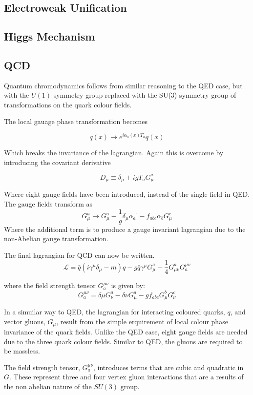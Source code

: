 \subsection{Electroweak Unification}

\subsection{Higgs Mechanism}

\subsection{QCD}
Quantum chromodynamics follows from similar reasoning to the QED case, but with
the $U(1)$ symmetry group replaced with the SU(3) symmetry group of
transformations on the quark colour fields.

The local gauage phase transformation becomes

\begin{equation}
q(x) \to e^{i\alpha_a(x)T_a} q(x)
\end{equation}

Which breaks the invariance of the lagrangian. Again this is overcome by
introducing the covariant derivative

\begin{equation}
D_{\mu} \equiv \delta_{\mu} + i g T_{a} G_{\mu}^{a}
\end{equation}

Where eight gauge fields have been introduced, instead of the single field in
QED.
The gauge fields transform as 
\begin{equation}
 G_{\mu}^{a} \to G_{\mu}^{a} 
-\frac{1}{g}\delta_{\mu}\alpha_{a}]
-f_{abc}\alpha_{b}G^{c}_{\mu}
\end{equation}
Where the additional term is to produce a gauge invariant lagrangian due to the
non-Abelian gauge transformation.

The final lagrangian for QCD can now be written.
\begin{equation}
\mathcal{L} = 
\bar{q}(i\gamma^{\mu}\delta_{\mu} - m)q -
g \bar{q} \gamma^{\mu} G_{\mu}^{a} - 
\frac{1}{4} G_{\mu\nu}^{a} G^{\mu\nu}_{a}
\end{equation}

where the field strength tensor $G^{\mu\nu}_{a}$ is given by:
\begin{equation}
G^{\mu\nu}_{a} 
= \delta{\mu} G^{a}_{\nu}
- \delta{\nu} G^{a}_{\mu}
-g f_{abc} G^{b}_{\mu} G^{c}_{\nu}
\end{equation}

In a simuilar way to QED, the lagrangian for interacting coloured quarks, $q$, and
vector gluons, $G_{\mu}$, result from the simple erquirement of local colour
phase invariance of the quark fields. Unlike the QED case, eight gauge fields
are needed due to the three quark colour fields.  Similar to QED, the gluons are
required to  be massless.

The field strength tensor, $G^{\mu\nu}_{a}$, introduces terms that are cubic and
quadratic in $G$. These represent three and four vertex gluon interactions that
are a results of the non abelian nature of the $SU(3)$ group.

